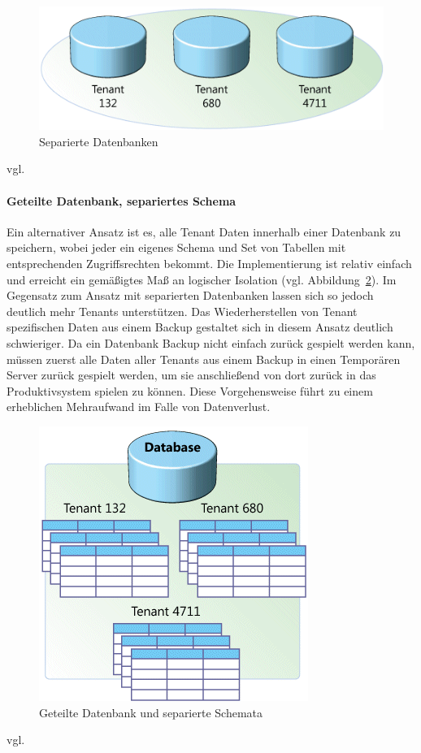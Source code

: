 \begin{figure}[h]
	\centering
	\includegraphics[width=0.7\linewidth]{images/separierte_datenbanken}
	\caption{Separierte Datenbanken}
	\label{fig:separierteDatenbanken}
\end{figure}
vgl.	

\paragraph{Geteilte Datenbank, separiertes Schema}
Ein alternativer Ansatz ist es, alle Tenant Daten innerhalb einer Datenbank zu speichern, wobei jeder ein eigenes Schema und Set von Tabellen mit entsprechenden Zugriffsrechten bekommt.
Die Implementierung ist relativ einfach und erreicht ein gemäßigtes Maß an logischer Isolation (vgl. Abbildung~\ref{fig:geteilteDatenbank}). Im Gegensatz zum Ansatz mit separierten Datenbanken lassen sich so jedoch deutlich mehr Tenants unterstützen. Das Wiederherstellen von Tenant spezifischen Daten aus einem Backup gestaltet sich in diesem Ansatz deutlich schwieriger. Da ein Datenbank Backup nicht einfach zurück gespielt werden kann, müssen zuerst alle Daten aller Tenants aus einem Backup in einen Temporären Server zurück gespielt werden, um sie anschließend von dort zurück in das Produktivsystem spielen zu können. Diese Vorgehensweise führt zu einem erheblichen Mehraufwand im Falle von Datenverlust.

\begin{figure}[h]
	\centering
	\includegraphics[width=0.5\linewidth]{images/geteilte_datenbanken-separiertes_schema}
	\caption{Geteilte Datenbank und separierte Schemata}
	\label{fig:geteilteDatenbank}
\end{figure}
vgl.

